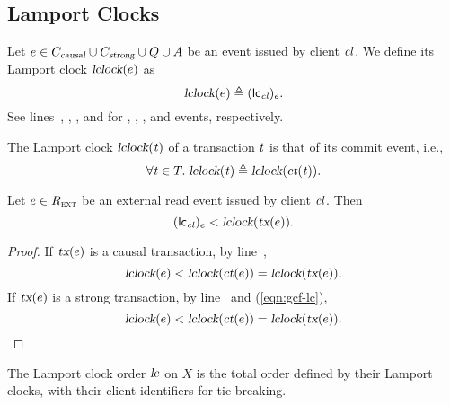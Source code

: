 
\subsection{Lamport Clocks} \label{ss:lc}

\begin{appdefinition} \label{def:lc-op}
  Let $e \in C_{\textsl{causal}} \cup C_{\textsl{strong}} \cup Q \cup A$
  be an event issued by client $\mathit{cl}$.
  We define its Lamport clock $\textsl{lclock}(e)$ as
  \[
    \textsl{lclock}(e) \triangleq ({\sf lc}_{\mathit{cl}})_{e}.
  \]
  See lines~\code{\ref{alg:unistore-client}}{\ref{line:commitcausaltx-lc}},
  \code{\ref{alg:unistore-client}}{\ref{line:commitstrongtx-lc}},
  \code{\ref{alg:unistore-client}}{\ref{line:fence-lc}},
  and \code{\ref{alg:unistore-client}}{\ref{line:clattach-lc}}
  for \commitcausaltx, \commitstrongtx, \fence, and \clattach{} events, respectively.
\end{appdefinition}

\begin{appdefinition} \label{def:lc-tx}
  The Lamport clock $\textsl{lclock}(\mathit{t})$ of a transaction $\mathit{t}$
  is that of its commit event, i.e.,
  \[
    \forall \mathit{t} \in T.\;
      \textsl{lclock}(\mathit{t}) \triangleq \textsl{lclock}(\textsl{ct}(\mathit{t})).
  \]
\end{appdefinition}

\begin{applemma} \label{lemma:lc-extread-commit}
  Let $e \in R_{\textsc{ext}}$ be an external read event issued by client $\mathit{cl}$.
  Then
  \[
    ({\sf lc}_{\mathit{cl}})_{e} < \textsl{lclock}(\textsl{tx}(e)).
  \]
\end{applemma}

\begin{proof} \label{proof:lc-extread-commit}
  If $\textsl{tx}(e)$ is a causal transaction,
  by line~\code{\ref{alg:unistore-client}}{\ref{line:commitcausaltx-lc}},
  \[
    \textsl{lclock}(e) < \textsl{lclock}(\textsl{ct}(e)) = \textsl{lclock}(\textsl{tx}(e)).
  \]
  If $\textsl{tx}(e)$ is a strong transaction,
  by line~\code{\ref{alg:unistore-client}}{\ref{line:commitstrongtx-lc-so}}
  and (\ref{eqn:gcf-lc}),
  \[
    \textsl{lclock}(e) < \textsl{lclock}(\textsl{ct}(e)) = \textsl{lclock}(\textsl{tx}(e)).
  \]
\end{proof}

\begin{appdefinition} \label{def:lco}
  The Lamport clock order $\textsl{lc}$ on $X$
  is the total order defined by their Lamport clocks,
  with their client identifiers for tie-breaking.
\end{appdefinition}

